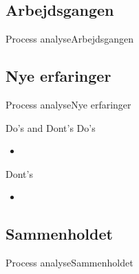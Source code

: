 \documentclass[10pt]{beamer}
\begin{document}
        \subsection{Arbejdsgangen}
        \begin{frame}{Process analyse}{Arbejdsgangen}
            
        \end{frame}
        
        \subsection{Nye erfaringer}
        \begin{frame}{Process analyse}{Nye erfaringer}
            \begin{block}{Do's and Dont's}
                Do's
                \begin{itemize}
                    \item 
                \end{itemize}
                Dont's
                \begin{itemize}
                    \item 
                \end{itemize}
            \end{block}
        \end{frame}
        
        
        \subsection{Sammenholdet}
        \begin{frame}{Process analyse}{Sammenholdet}
            
        \end{frame}
    
    {\aauwavesbg
    \begin{frame}
    \end{frame}}
\end{document}
